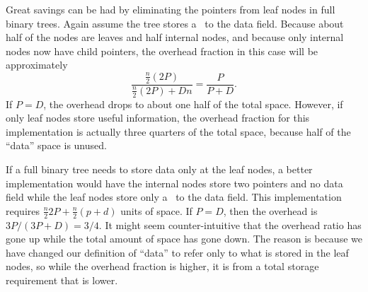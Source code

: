 Great savings can be had by eliminating the pointers from leaf
nodes in full binary trees.
Again assume the tree stores a \pointref\ to the data field.
Because about half of the nodes are leaves and half internal nodes,
and because only internal nodes now have child pointers, the
overhead fraction in this case will be approximately
\[\frac{\frac{n}{2} (2P)}{\frac{n}{2} (2P) + Dn} = \frac{P}{P + D}.\]
\noindent If \(P = D\), the overhead drops to about one half of the
total space.
However, if only leaf nodes store useful information, the overhead
fraction for this implementation is actually three quarters of the
total space, because half of the ``data'' space is unused.

If a full binary tree needs to store data only
at the leaf nodes, a better implementation would have
the internal nodes store two pointers and no data
field while the leaf nodes store only a \pointref\ to the data field.
This implementation requires
\(\frac{n}{2}2P + \frac{n}{2}(p+d)\) units of space.
If \(P = D\), then the overhead is \(3P/(3P + D) = 3/4\).
It might seem counter-intuitive that the overhead ratio has gone up
while the total amount of space has gone down.
The reason is because we have changed our definition of ``data'' to
refer only to what is stored in the leaf nodes,
so while the overhead fraction is higher, it is from a
total storage requirement that is lower.

